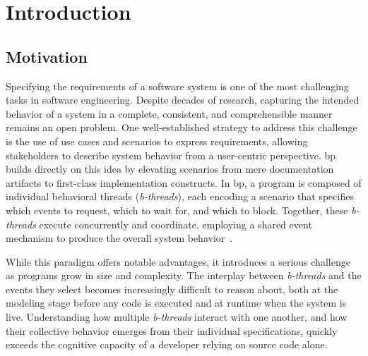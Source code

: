 \chapter{Introduction}
\label{chapter:intro}

\section{Motivation}
\label{sec:intro_motivation}

Specifying the requirements of a software system is one of the most challenging tasks in software engineering.
Despite decades of research, capturing the intended behavior of a system in a complete, consistent, and comprehensible manner remains an open problem.
One well-established strategy to address this challenge is the use of use cases and scenarios to express requirements, allowing stakeholders to describe system behavior from a user-centric perspective.
\gls{bp} builds directly on this idea by elevating scenarios from mere documentation artifacts to first-class implementation constructs.
In \gls{bp}, a program is composed of individual behavioral threads (\textit{b-threads}), each encoding a scenario that specifies which events to request, which to wait for, and which to block.
Together, these \textit{b-threads} execute concurrently and coordinate, employing a shared event mechanism to produce the overall system behavior~\cite{harel_behavioral_2012}.

While this paradigm offers notable advantages, it introduces a serious challenge as programs grow in size and complexity.
The interplay between \textit{b-threads} and the events they select becomes increasingly difficult to reason about, both at the modeling stage before any code is executed and at runtime when the system is live.
Understanding how multiple \textit{b-threads} interact with one another, and how their collective behavior emerges from their individual specifications, quickly exceeds the cognitive capacity of a developer relying on source code alone.

